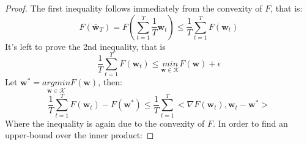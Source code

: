 \begin{proof}
    The first inequality follows immediately from the convexity of $F$, that is:
    \begin{equation*}
        F(\bar{\pmb{w}}_T) = F(\sum_{t=1}^T \frac{1}{T} \pmb{w}_t) \leq \frac{1}{T} \sum_{t=1}^T F(\pmb{w}_t)
    \end{equation*}
    It's left to prove the 2nd inequality, that is
    \begin{equation*}        
        \frac{1}{T} \sum_{t=1}^T F(\pmb{w}_t) \leq \underset{\pmb{w}\in \mathcal{K}}{min} F(\pmb{w}) + \epsilon
    \end{equation*}
    Let $\pmb{w}^* = \underset{\pmb{w}\in \mathcal{K}}{argmin} F(\pmb{w})$, then:
    \begin{equation*}
        \frac{1}{T} \sum_{t=1}^T F(\pmb{w}_t) - F(\pmb{w}^*) \leq \frac{1}{T} \sum_{t=1}^T <\nabla F(\pmb{w}_t), \pmb{w}_t - \pmb{w}^*>
    \end{equation*}
    Where the inequality is again due to the convexity of $F$. In order to find an upper-bound over the inner product:


\end{proof}
